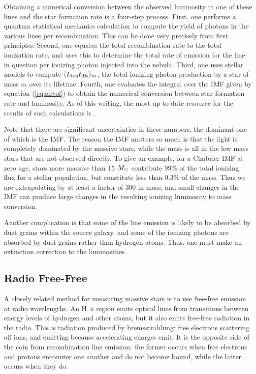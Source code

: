Obtaining a numerical conversion between the observed luminosity in one of these lines and the star formation rate is a four-step process. First, one performs a quantum statistical mechanics calculation to compute the yield of photons in the various lines per recombination. This can be done very precisely from first principles. Second, one equates the total recombination rate to the total ionization rate, and uses this to determine the total rate of emission for the line in question per ionizing photon injected into the nebula. Third, one uses stellar models to compute $\langle L_{\rm ion} t_{\rm life}\rangle_m$, the total ionizing photon production by a star of mass $m$ over its lifetime. Fourth, one evaluates the integral over the IMF given by equation (\ref{eq:sfrtol}) to obtain the numerical conversion between star formation rate and luminosity. As of this writing, the most up-to-date resource for the results of such calculations is \citet{kennicutt12a}.

Note that there are significant uncertainties in these numbers, the dominant one of which is the IMF. The reason the IMF matters so much is that the light is completely dominated by the massive stars, while the mass is all in the low mass stars that are not observed directly. To give an example, for a Chabrier IMF at zero age, stars more massive than 15 $M_{\odot}$ contribute 99\% of the total ionizing flux for a stellar population, but constitute less than 0.3\% of the mass. Thus we are extrapolating by at least a factor of 300 in mass, and small changes in the IMF can produce large changes in the resulting ionizing luminosity to mass conversion.

Another complication is that some of the line emission is likely to be absorbed by dust grains within the source galaxy, and some of the ionizing photons are absorbed by dust grains rather than hydrogen atoms. Thus, one must make an extinction correction to the luminosities.

\subsection{Radio Free-Free}

A closely related method for measuring massive stars is to use free-free emission at radio wavelengths. An H~\textsc{ii} region emits optical lines from transitions between energy levels of hydrogen and other atoms, but it also emits free-free radiation in the radio. This is radiation produced by bremsstrahlung: free electrons scattering off ions, and emitting because accelerating charges emit. It is the opposite side of the coin from recombination line emission: the former occurs when free electrons and protons encounter one another and do not become bound, while the latter occurs when they do.

